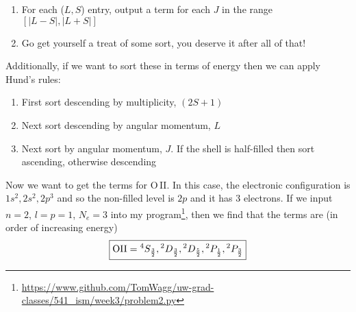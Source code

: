 \documentclass[12pt, letterpaper, twoside]{article}
\begin{document}
{\begin{enumerate}
\begin{enumerate}
            \item Subtract a unitary matrix that ranges from the $(-L, L)$ rows and from the $(-S, S)$ columns from the overall matrix
        \end{enumerate}
        \item For each ($L, S$) entry, output a term for each $J$ in the range $[|L - S|, |L + S|]$
        \item Go get yourself a treat of some sort, you deserve it after all of that!
    \end{enumerate}
    Additionally, if we want to sort these in terms of energy then we can apply Hund's rules:
    \begin{enumerate}
        \item First sort descending by multiplicity, $(2 S + 1)$
        \item Next sort descending by angular momentum, $L$
        \item Next sort by angular momentum, $J$. If the shell is half-filled then sort ascending, otherwise descending
    \end{enumerate}
    Now we want to get the terms for O\,II. In this case, the electronic configuration is $1 s^2, 2s^2, 2p^3$ and so the non-filled level is $2p$ and it has $3$ electrons. If we input $n = 2$, $l = p = 1$, $N_e = 3$ into my program\footnote{\url{https://www.github.com/TomWagg/uw-grad-classes/541_ism/week3/problem2.py}}, then we find that the terms are (in order of increasing energy)
    \begin{equation}
        \boxed{ {\rm O II} = {}^{4} S_{\frac{3}{2}}, {}^{2}D_{\frac{3}{2}}, {}^{2} D_{\frac{5}{2}}, {}^{2} P_{\frac{1}{2}}, {}^{2} P_{\frac{3}{2}} }
    \end{equation} 
}
\end{document}

